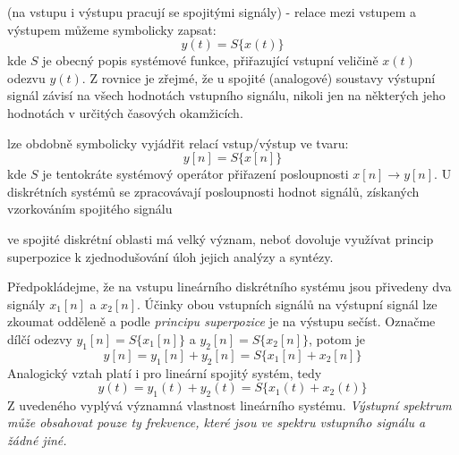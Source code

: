     \begin{description}[leftmargin=3em,labelindent=1em, style=nextline]
      \item[Systémy se spojitým časem] (na vstupu i výstupu pracují se spojitými signály) - relace  
            mezi vstupem a výstupem můžeme symbolicky zapsat:
            \begin{equation}\label{tky:eq005}
              y(t)=S\{x(t)\}
            \end{equation}
            kde \(S\) je obecný popis systémové funkce, přiřazující vstupní veličině \(x(t)\) odezvu 
            \(y(t)\). Z rovnice je zřejmé, že u spojité (analogové) soustavy výstupní signál závisí 
            na všech hodnotách vstupního signálu, nikoli jen na některých jeho hodnotách v určitých 
            časových okamžicích.
      \item[Systémy pracující s diskrétním časem] lze obdobně symbolicky vyjádřit relací  
            vstup/výstup ve tvaru:
            \begin{equation}\label{tky:eq022}
              y[n]=S\{x[n]\}
            \end{equation}
            kde \(S\) je tentokráte systémový operátor přiřazení posloupnosti \(x[n]\rightarrow
            y[n]\). U diskrétních systémů se zpracovávají posloupnosti hodnot signálů, získaných
            vzorkováním spojitého signálu
      \item[Linearita systémů] ve spojité diskrétní oblasti má velký význam, neboť dovoluje využívat
            princip superpozice k zjednodušování úloh jejich analýzy  a syntézy.

            Předpokládejme, že na vstupu lineárního diskrétního systému jsou přivedeny dva signály
            \(x_1[n]\) a \(x_2[n]\). Účinky obou vstupních signálů na výstupní signál lze zkoumat
            odděleně a podle \emph{principu superpozice} je na výstupu sečíst. Označme dílčí odezvy
            \(y_1[n]=S\{x_1[n]\}\) a \(y_2[n]=S\{x_2 [n]\}\), potom je
            \begin{equation}\label{tky:eq007}
              y[n]= y_1[n]+y_2[n]=S\{x_1[n]+x_2[n]\}
            \end{equation}
            Analogický vztah platí i pro lineární spojitý systém, tedy
            \begin{equation}\label{tky:eq008}
              y(t)= y_1(t)+ y_2(t)=S\{x_1(t)+x_2(t)\}
            \end{equation}
            Z uvedeného vyplývá významná vlastnost lineárního systému. \emph{Výstupní spektrum může
            obsahovat pouze ty frekvence, které jsou ve spektru vstupního signálu a žádné jiné.} 


\end{description}
